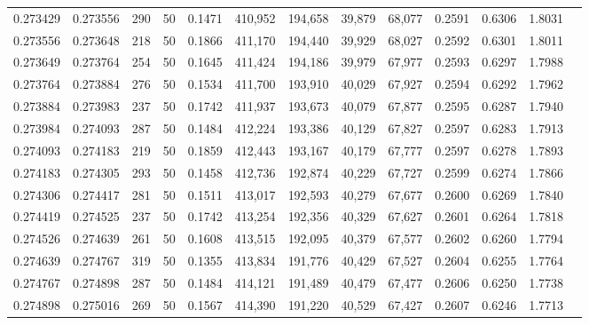 \begin{tabular}{rrrrrrrrrrrrr}
0.273429 & 0.273556 &   290 &  50 &                                     0.1471 & 410,952 & 194,658 &  39,879 &  68,077 & 0.2591 & 0.6306 & 1.8031 \\
0.273556 & 0.273648 &   218 &  50 &                                     0.1866 & 411,170 & 194,440 &  39,929 &  68,027 & 0.2592 & 0.6301 & 1.8011 \\
0.273649 & 0.273764 &   254 &  50 &                                     0.1645 & 411,424 & 194,186 &  39,979 &  67,977 & 0.2593 & 0.6297 & 1.7988 \\
0.273764 & 0.273884 &   276 &  50 &                                     0.1534 & 411,700 & 193,910 &  40,029 &  67,927 & 0.2594 & 0.6292 & 1.7962 \\
0.273884 & 0.273983 &   237 &  50 &                                     0.1742 & 411,937 & 193,673 &  40,079 &  67,877 & 0.2595 & 0.6287 & 1.7940 \\
0.273984 & 0.274093 &   287 &  50 &                                     0.1484 & 412,224 & 193,386 &  40,129 &  67,827 & 0.2597 & 0.6283 & 1.7913 \\
0.274093 & 0.274183 &   219 &  50 &                                     0.1859 & 412,443 & 193,167 &  40,179 &  67,777 & 0.2597 & 0.6278 & 1.7893 \\
0.274183 & 0.274305 &   293 &  50 &                                     0.1458 & 412,736 & 192,874 &  40,229 &  67,727 & 0.2599 & 0.6274 & 1.7866 \\
0.274306 & 0.274417 &   281 &  50 &                                     0.1511 & 413,017 & 192,593 &  40,279 &  67,677 & 0.2600 & 0.6269 & 1.7840 \\
0.274419 & 0.274525 &   237 &  50 &                                     0.1742 & 413,254 & 192,356 &  40,329 &  67,627 & 0.2601 & 0.6264 & 1.7818 \\
0.274526 & 0.274639 &   261 &  50 &                                     0.1608 & 413,515 & 192,095 &  40,379 &  67,577 & 0.2602 & 0.6260 & 1.7794 \\
0.274639 & 0.274767 &   319 &  50 &                                     0.1355 & 413,834 & 191,776 &  40,429 &  67,527 & 0.2604 & 0.6255 & 1.7764 \\
0.274767 & 0.274898 &   287 &  50 &                                     0.1484 & 414,121 & 191,489 &  40,479 &  67,477 & 0.2606 & 0.6250 & 1.7738 \\
0.274898 & 0.275016 &   269 &  50 &                                     0.1567 & 414,390 & 191,220 &  40,529 &  67,427 & 0.2607 & 0.6246 & 1.7713 \\

\end{tabular}

